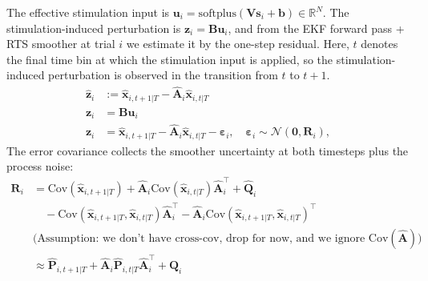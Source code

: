 \documentclass[11pt,letterpaper]{article} %
\newcommand{\inlinecomment}[1]{}
\begin{document}
The effective stimulation input is $\bm{u}_i = \mathrm{softplus}(\bm{V}\bm{s}_i+\bm{b}) \in \mathbb{R}^N$. The stimulation-induced perturbation is $\bm{z}_i = \bm{B}\bm{u}_i$, and from the EKF forward pass + RTS smoother at trial $i$ we estimate it by the one-step residual. Here, $t$ denotes the final time bin at which the stimulation input is applied, so the stimulation-induced perturbation is observed in the transition from $t$ to $t+1$.
\begin{align*}
    \hat{\bm{z}}_i &:= \hat{\bm{x}}_{i,t+1|T} - \hat{\bm{A}}_i\hat{\bm{x}}_{i,t|T}\\
    \bm{z}_i &= \bm{B}\bm{u}_i\\
    \bm{z}_i &= \hat{\bm{x}}_{i,t+1|T} - \hat{\bm{A}}_i\hat{\bm{x}}_{i,t|T} - \boldsymbol{\varepsilon}_i, \quad \boldsymbol{\varepsilon}_i \sim \mathcal{N}(\bm{0},\bm{R}_i),
\end{align*}
The error covariance collects the smoother uncertainty at both timesteps plus the process noise:
\begin{align*}
    \bm{R}_i
    &= \mathrm{Cov}(\hat{\bm{x}}_{i,t+1|T}) + \hat{\bm{A}}_i\mathrm{Cov}(\hat{\bm{x}}_{i,t|T})\hat{\bm{A}}_i^\top + \hat{\bm{Q}}_i \\
    &\quad - \mathrm{Cov}(\hat{\bm{x}}_{i,t+1|T}, \hat{\bm{x}}_{i,t|T})\hat{\bm{A}}_i^\top
           - \hat{\bm{A}}_i\mathrm{Cov}(\hat{\bm{x}}_{i,t+1|T}, \hat{\bm{x}}_{i,t|T})^\top \\ &\text{(Assumption: we don't have cross-cov, drop for now, and we ignore $\mathrm{Cov}(\hat{\bm{A}})$)} \\
    &\approx \hat{\bm{P}}_{i,t+1|T} + \hat{\bm{A}}_i\hat{\bm{P}}_{i,t|T}\hat{\bm{A}}_i^\top + \hat{\bm{Q}}_i
\end{align*}

\inlinecomment{The RTS smoother does produce the lag-one cross-covariance (it is already needed for the M-step). If it is available, keep these two terms rather than dropping them --- they are subtractive, so dropping them inflates $\bm{R}_i$ and makes every stimulus look less informative than it is.}
\end{document}
